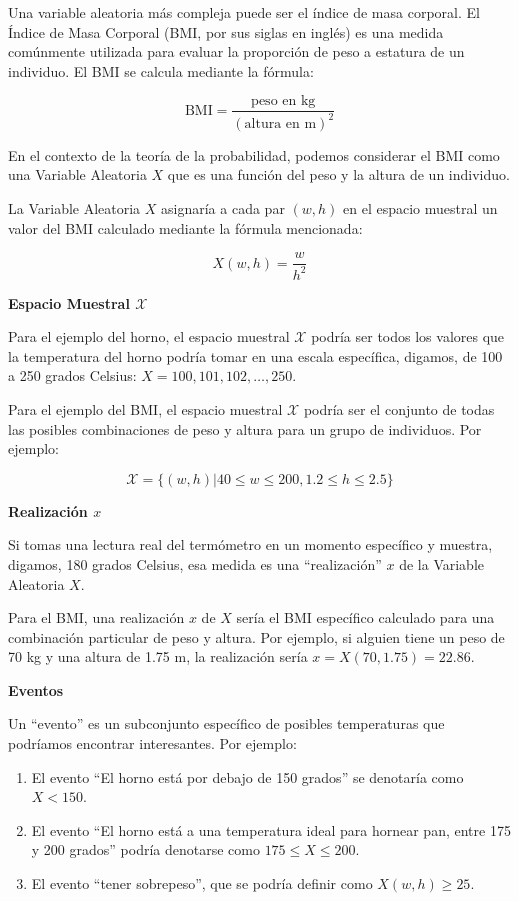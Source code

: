\documentclass[
  letterpaper,
  DIV=11,
  numbers=noendperiod]{scrartcl}
\providecommand{\tightlist}{%
  \setlength{\itemsep}{0pt}\setlength{\parskip}{0pt}}\usepackage{longtable,booktabs,array}
\begin{document}
Una variable aleatoria más compleja puede ser el índice de masa
corporal. El Índice de Masa Corporal (BMI, por sus siglas en inglés) es
una medida comúnmente utilizada para evaluar la proporción de peso a
estatura de un individuo. El BMI se calcula mediante la fórmula:

\[
\text{BMI} = \frac{{\text{peso en kg}}}{{(\text{altura en m})^2}}
\]

En el contexto de la teoría de la probabilidad, podemos considerar el
BMI como una Variable Aleatoria \(X\) que es una función del peso y la
altura de un individuo.

La Variable Aleatoria \(X\) asignaría a cada par \((w, h)\) en el
espacio muestral un valor del BMI calculado mediante la fórmula
mencionada:

\[
X(w, h) = \frac{w}{h^2}
\]

\textbf{Espacio Muestral \(\mathcal{X}\)}

Para el ejemplo del horno, el espacio muestral \(\mathcal{X}\) podría
ser todos los valores que la temperatura del horno podría tomar en una
escala específica, digamos, de 100 a 250 grados Celsius:
\(X={100,101,102,…,250}\).

Para el ejemplo del BMI, el espacio muestral \(\mathcal{X}\) podría ser
el conjunto de todas las posibles combinaciones de peso y altura para un
grupo de individuos. Por ejemplo:

\[
\mathcal{X} = \{ (w, h) | 40 \leq w \leq 200, 1.2 \leq h \leq 2.5 \}
\]

\textbf{Realización \(x\)}

Si tomas una lectura real del termómetro en un momento específico y
muestra, digamos, 180 grados Celsius, esa medida es una ``realización''
\(x\) de la Variable Aleatoria \(X\).

Para el BMI, una realización \(x\) de \(X\) sería el BMI específico
calculado para una combinación particular de peso y altura. Por ejemplo,
si alguien tiene un peso de 70 kg y una altura de 1.75 m, la realización
sería \(x = X(70, 1.75) = 22.86\).

\textbf{Eventos}

Un ``evento'' es un subconjunto específico de posibles temperaturas que
podríamos encontrar interesantes. Por ejemplo:

\begin{enumerate}
\def\labelenumi{\arabic{enumi}.}
\tightlist
\item
  El evento ``El horno está por debajo de 150 grados'' se denotaría como
  \(X<150\).
\item
  El evento ``El horno está a una temperatura ideal para hornear pan,
  entre 175 y 200 grados'' podría denotarse como \(175\leq X \leq 200\).
\item
  El evento ``tener sobrepeso'', que se podría definir como
  \(X(w, h) \geq 25\).
\end{enumerate}
\end{document}

